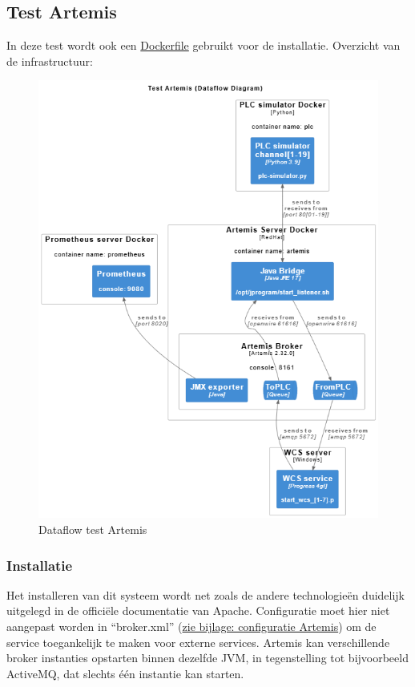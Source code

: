 \subsection{Test Artemis}
In deze test wordt ook een \hyperref[listing:docker_artemis]{Dockerfile} gebruikt voor de installatie.
Overzicht van de infrastructuur:
\begin{figure}[h!]
  \centering
  \includegraphics[width=.95\textwidth]{img/test-artemis-dataflow.png}
  \caption{\label{fig:test_artemis_dataflow}Dataflow test Artemis}
\end{figure}

\subsubsection{Installatie}
Het installeren van dit systeem wordt net zoals de andere technologieën duidelijk uitgelegd in de officiële documentatie van Apache.
Configuratie moet hier niet aangepast worden in ``broker.xml'' (\hyperref[listing:broker_artemis]{zie bijlage: configuratie Artemis}) om de service toegankelijk te maken voor externe services.
Artemis kan verschillende broker instanties opstarten binnen dezelfde JVM, in tegenstelling tot bijvoorbeeld ActiveMQ, dat slechts één instantie kan starten.

